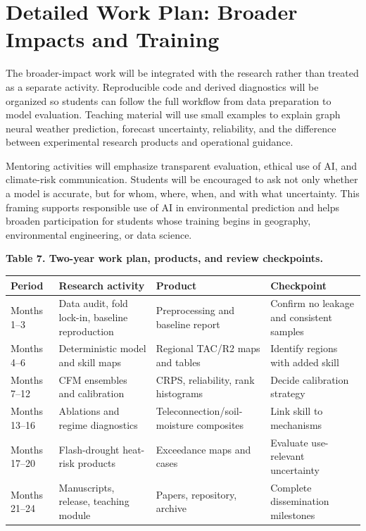 \documentclass[11pt,letterpaper]{article}
\begin{document}
\newpage
\section*{Detailed Work Plan: Broader Impacts and Training}
The broader-impact work will be integrated with the research rather than treated as a separate activity. Reproducible code and derived diagnostics will be organized so students can follow the full workflow from data preparation to model evaluation. Teaching material will use small examples to explain graph neural weather prediction, forecast uncertainty, reliability, and the difference between experimental research products and operational guidance.

Mentoring activities will emphasize transparent evaluation, ethical use of AI, and climate-risk communication. Students will be encouraged to ask not only whether a model is accurate, but for whom, where, when, and with what uncertainty. This framing supports responsible use of AI in environmental prediction and helps broaden participation for students whose training begins in geography, environmental engineering, or data science.

\begin{center}\scriptsize
\textbf{Table 7. Two-year work plan, products, and review checkpoints.}\\[0.03in]
\begin{tabularx}{\textwidth}{p{}p{}p{}X}
\toprule
\textbf{Period} & \textbf{Research activity} & \textbf{Product} & \textbf{Checkpoint}\\
\midrule
Months 1--3 & Data audit, fold lock-in, baseline reproduction & Preprocessing and baseline report & Confirm no leakage and consistent samples\\
Months 4--6 & Deterministic model and skill maps & Regional TAC/R2 maps and tables & Identify regions with added skill\\
Months 7--12 & CFM ensembles and calibration & CRPS, reliability, rank histograms & Decide calibration strategy\\
Months 13--16 & Ablations and regime diagnostics & Teleconnection/soil-moisture composites & Link skill to mechanisms\\
Months 17--20 & Flash-drought heat-risk products & Exceedance maps and cases & Evaluate use-relevant uncertainty\\
Months 21--24 & Manuscripts, release, teaching module & Papers, repository, archive & Complete dissemination milestones\\
\bottomrule
\end{tabularx}
\end{center}
\end{document}
